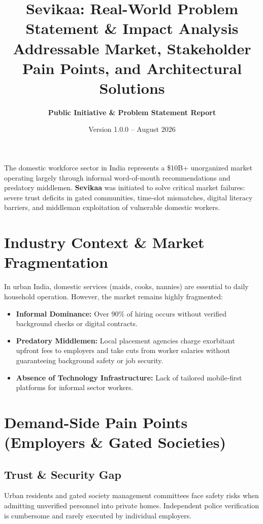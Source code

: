 \documentclass[11pt,a4paper]{article}
\title{\textbf{\huge Sevikaa: Real-World Problem Statement \& Impact Analysis}\\[0.5em]
\large Addressable Market, Stakeholder Pain Points, and Architectural Solutions}
\author{\textbf{Public Initiative \& Problem Statement Report}}
\date{Version 1.0.0 -- August 2026}
\begin{document}
\maketitle

\begin{tcolorbox}[colback=blue!5white,colframe=primaryblue,title=\textbf{Executive Overview}]
The domestic workforce sector in India represents a \$10B+ unorganized market operating largely through informal word-of-mouth recommendations and predatory middlemen. \textbf{Sevikaa} was initiated to solve critical market failures: severe trust deficits in gated communities, time-slot mismatches, digital literacy barriers, and middleman exploitation of vulnerable domestic workers.
\end{tcolorbox}

\section{Industry Context \& Market Fragmentation}
In urban India, domestic services (maids, cooks, nannies) are essential to daily household operation. However, the market remains highly fragmented:
\begin{itemize}[noitemsep]
    \item \textbf{Informal Dominance:} Over 90\% of hiring occurs without verified background checks or digital contracts.
    \item \textbf{Predatory Middlemen:} Local placement agencies charge exorbitant upfront fees to employers and take cuts from worker salaries without guaranteeing background safety or job security.
    \item \textbf{Absence of Technology Infrastructure:} Lack of tailored mobile-first platforms for informal sector workers.
\end{itemize}

\section{Demand-Side Pain Points (Employers \& Gated Societies)}

\subsection{Trust \& Security Gap}
Urban residents and gated society management committees face safety risks when admitting unverified personnel into private homes. Independent police verification is cumbersome and rarely executed by individual employers.
\end{document}
